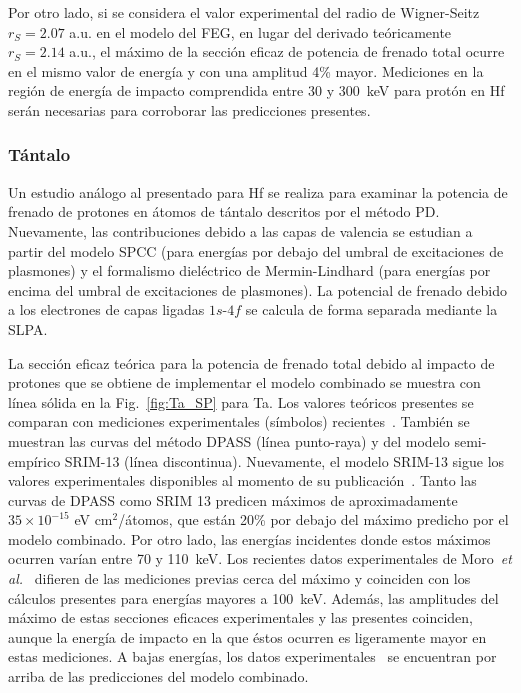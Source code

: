 Por otro lado, si se considera el valor experimental del radio de 
Wigner-Seitz $r_S=2.07$ a.u. en el modelo del FEG, en lugar del derivado 
teóricamente $r_S=2.14$ a.u., el máximo de la sección eficaz de potencia 
de frenado total ocurre en el mismo valor de energía y con una amplitud 
4\% mayor.
Mediciones en la región de energía de impacto comprendida entre 30 y 
300~keV para protón en Hf serán necesarias para corroborar las 
predicciones presentes. 


\subsubsection{Tántalo}

Un estudio análogo al presentado para Hf se realiza para examinar la 
potencia de frenado de protones en átomos de tántalo descritos por el 
método PD. Nuevamente, las contribuciones debido a las capas de valencia 
se estudian a partir del modelo SPCC (para energías por debajo del 
umbral de excitaciones de plasmones) y el formalismo dieléctrico de 
Mermin-Lindhard (para energías por encima del umbral de excitaciones de 
plasmones). La potencial de frenado debido a los electrones de capas 
ligadas $1s$-$4f$ se calcula de forma separada mediante la SLPA.

La sección eficaz teórica para la potencia de frenado total debido al 
impacto de protones que se obtiene de implementar el modelo combinado se 
muestra con línea sólida en la Fig.~\ref{fig:Ta_SP} para Ta. Los valores 
teóricos presentes se comparan con mediciones experimentales (símbolos)
recientes~\cite{Moro:20,Roth:17,iaea,Shiomi:96,Shiomi:94,Bichsel:92,
Ogino:88,Sirotinin:84,Krist:83}. También se muestran las curvas del 
método DPASS (línea punto-raya) y del modelo semi-empírico SRIM-13 
(línea discontinua). Nuevamente, el modelo SRIM-13 sigue los valores 
experimentales disponibles al momento de su publicación~\cite{iaea}. 
Tanto las curvas de DPASS como SRIM 13 predicen máximos de 
aproximadamente $35\times 10^{-15}$ eV cm$^2$/átomos, que están 20\% por 
debajo del máximo predicho por el modelo combinado. Por otro lado, las 
energías incidentes donde estos máximos ocurren varían entre 70 y 
110~keV. Los recientes datos experimentales de 
Moro~\textit{et al.}~\cite{Moro:20} difieren de las mediciones previas 
cerca del máximo y coinciden con los cálculos presentes para energías 
mayores a 100~keV. Además, las amplitudes del máximo de estas secciones 
eficaces experimentales y las presentes coinciden, aunque la energía de 
impacto en la que éstos ocurren es ligeramente mayor en estas mediciones. 
A bajas energías, los datos experimentales~\cite{Roth:17} se encuentran 
por arriba de las predicciones del modelo combinado. 


